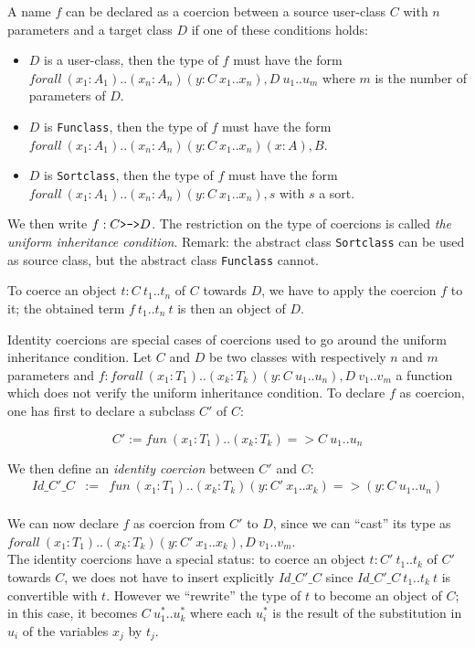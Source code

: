   A name $f$ can be declared as a coercion between a source user-class
$C$ with $n$ parameters and a target class $D$ if one of these
conditions holds:

\newcommand{\oftype}{\!:\!}

\begin{itemize}
\item $D$ is a user-class, then the type of $f$ must have the form
      $forall~ (x_1 \oftype A_1)..(x_n \oftype A_n)(y\oftype C~x_1..x_n), D~u_1..u_m$ where $m$
      is the number of parameters of $D$.
\item $D$ is {\tt Funclass}, then the type of $f$ must have the form
      $forall~ (x_1\oftype A_1)..(x_n\oftype A_n)(y\oftype C~x_1..x_n)(x:A), B$. 
\item $D$ is {\tt Sortclass}, then the type of $f$ must have the form
      $forall~ (x_1\oftype A_1)..(x_n\oftype A_n)(y\oftype C~x_1..x_n), s$ with $s$ a sort. 
\end{itemize}

We then write $f:C \mbox{\texttt{>->}} D$. The restriction on the type
of coercions is called {\em the uniform inheritance condition}.
Remark: the abstract class {\tt Sortclass} can be used as source class,
but the abstract class {\tt Funclass} cannot.

To coerce an object $t:C~t_1..t_n$ of $C$ towards $D$, we have to
apply the coercion $f$ to it; the obtained term $f~t_1..t_n~t$ is
then an object of $D$.


  Identity coercions are special cases of coercions used to go around
the uniform inheritance condition.  Let $C$ and $D$ be two classes
with respectively $n$ and $m$ parameters and
$f:forall~(x_1:T_1)..(x_k:T_k)(y:C~u_1..u_n), D~v_1..v_m$ a function which
does not verify the uniform inheritance condition. To declare $f$ as
coercion, one has first to declare a subclass $C'$ of $C$:

$$C' := fun~ (x_1:T_1)..(x_k:T_k) => C~u_1..u_n$$

\noindent We then define an {\em identity coercion} between $C'$ and $C$:
\begin{eqnarray*}
Id\_C'\_C  & := & fun~ (x_1:T_1)..(x_k:T_k)(y:C'~x_1..x_k) => (y:C~u_1..u_n)\\
\end{eqnarray*}

We can now declare $f$ as coercion from $C'$ to $D$, since we can
``cast'' its type as
$forall~ (x_1:T_1)..(x_k:T_k)(y:C'~x_1..x_k),D~v_1..v_m$.\\ The identity
coercions have a special status: to coerce an object $t:C'~t_1..t_k$
of $C'$ towards $C$, we does not have to insert explicitly $Id\_C'\_C$
since $Id\_C'\_C~t_1..t_k~t$ is convertible with $t$.  However we
``rewrite'' the type of $t$ to become an object of $C$; in this case,
it becomes $C~u_1^*..u_k^*$ where each $u_i^*$ is the result of the
substitution in $u_i$ of the variables $x_j$ by $t_j$.



